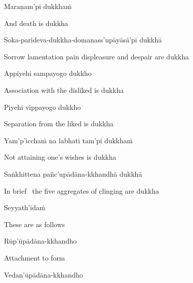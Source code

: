 Maraṇam'pi dukkhaṁ

\begin{english}
  And death is dukkha
\end{english}

Soka-parideva-dukkha-domanass'upāyāsā'pi dukkhā

\begin{english}
  Sorrow lamentation pain displeasure\makeatletter\hyperlink{endnote14-appendix}\makeatother
  and despair are dukkha
\end{english}

Appiyehi sampayogo dukkho

\begin{english}
  Association with the disliked is dukkha
\end{english}

Piyehi vippayogo dukkho

\begin{english}
  Separation from the liked is dukkha
\end{english}

Yam'p'icchaṁ na labhati tam'pi dukkhaṁ

\begin{english}
  Not attaining one's wishes is dukkha
\end{english}

\suttaRef{[MN 10]}

Saṅkhittena pañc'upādāna-kkhandhā dukkhā

\begin{english}
  In brief \breathmark\ the five aggregates of clinging are dukkha\makeatletter\hyperlink{endnote15-appendix}\makeatother
\end{english}

Seyyath'īdaṁ

\begin{english}
  These are as follows
\end{english}

Rūp'ūpādāna-kkhandho

\begin{english}
  Attachment to form
\end{english}

Vedan'ūpādāna-kkhandho

